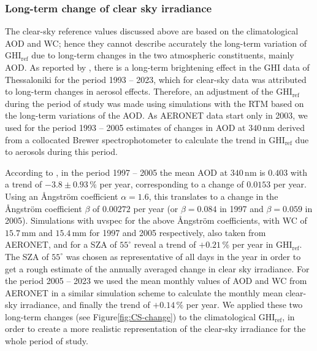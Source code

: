 \documentclass[preprint, 5p,
authoryear]{elsarticle} %
\begin{document}
\hypertarget{long-term-change-of-clear-sky-irradiance}{%
\subsubsection{Long-term change of clear sky
irradiance}\label{long-term-change-of-clear-sky-irradiance}}

The clear-sky reference values discussed above are based on the
climatological AOD and WC; hence they cannot describe accurately the
long-term variation of \(\text{GHI}_\text{ref}\) due to long-term
changes in the two atmospheric constituents, mainly AOD. As reported by
\citet{Natsis2023}, there is a long-term brightening effect in the GHI
data of Thessaloniki for the period 1993 -- 2023, which for clear-sky
data was attributed to long-term changes in aerosol effects. Therefore,
an adjustment of the \(\text{GHI}_\text{ref}\) during the period of
study was made using simulations with the RTM based on the long-term
variations of the AOD. As AERONET data start only in 2003, we used for
the period 1993 -- 2005 estimates of changes in AOD at
\(340\,\text{nm}\) derived from a collocated Brewer spectrophotometer
\citep{Kazadzis2007} to calculate the trend in \(\text{GHI}_\text{ref}\)
due to aerosols during this period.

According to \citet{Kazadzis2007}, in the period 1997 -- 2005 the mean
AOD at \(340\,\text{nm}\) is \(0.403\) with a trend of
\(-3.8\pm0.93\,\%\) per year, corresponding to a change of \(0.0153\)
per year. Using an Ångström coefficient \(\alpha = 1.6\), this
translates to a change in the Ångström coefficient \(\beta\) of
\(0.00272\) per year (or \(\beta=0.084\) in 1997 and \(\beta=0.059\) in
2005). Simulations with uvspec for the above Ångström coefficients, with
WC of \(15.7\,\text{mm}\) and \(15.4\,\text{mm}\) for 1997 and 2005
respectively, also taken from AERONET, and for a SZA of \(55^\circ\)
reveal a trend of \(+0.21\,\%\) per year in \(\text{GHI}_\text{ref}\).
The SZA of \(55^\circ\) was chosen as representative of all days in the
year in order to get a rough estimate of the annually averaged change in
clear sky irradiance. For the period 2005 -- 2023 we used the mean
monthly values of AOD and WC from AERONET in a similar simulation scheme
to calculate the monthly mean clear-sky irradiance, and finally the
trend of \(+0.14\,\%\) per year. We applied these two long-term changes
(see Figure\nobreakspace{}\ref{fig:CS-change}) to the climatological
\(\text{GHI}_\text{ref}\), in order to create a more realistic
representation of the clear-sky irradiance for the whole period of
study.
\end{document}
